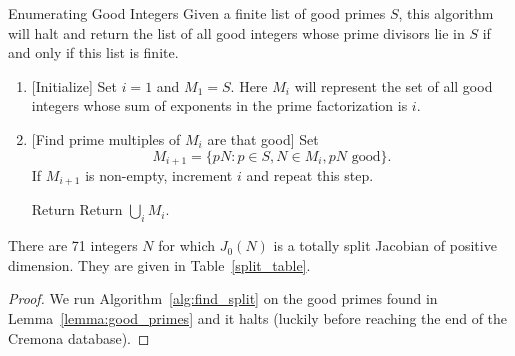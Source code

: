 \documentclass{article}
\begin{document}
\begin{algorithm}{Enumerating Good Integers}
    \label{alg:find_split}
    Given a finite list of good primes $S$, this algorithm will halt and
    return the list of all good integers whose prime divisors lie in $S$
    if and only if this list is finite.
\end{algorithm}
\begin{enumerate}
    \item{} [Initialize] 
        Set $i=1$ and $M_1=S$. Here $M_i$ will represent the set of all good
        integers whose sum of exponents in the prime factorization is $i$.
    \item{} [Find prime multiples of $M_i$ are that good]
        Set
        \[
            M_{i+1}=\{pN: p\in S, N\in M_i, pN \text{ good}\}.
        \]
        If $M_{i+1}$ is non-empty, increment $i$ and repeat this step.
    \item [Return] 
        Return $\bigcup_i M_i$.
\end{enumerate}

\begin{theorem}
    There are 71 integers $N$ for which $J_0(N)$ is a totally split Jacobian of
    positive dimension. They are given in Table~\ref{split_table}.
\end{theorem}
\begin{proof}
    We run Algorithm~\ref{alg:find_split} on the good primes found in
    Lemma~\ref{lemma:good_primes} and it halts (luckily before reaching the end
    of the Cremona database).
\end{proof}
\end{document}
